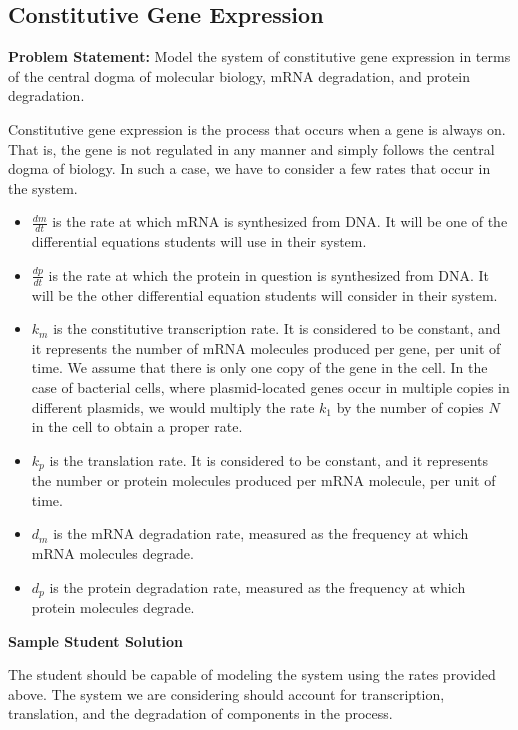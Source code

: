 \subsection{Constitutive Gene Expression}

\textbf{Problem Statement: } Model the system of constitutive gene expression in terms of the central dogma of molecular biology, mRNA degradation, and protein degradation.

Constitutive gene expression is the process that occurs when a gene is always on.
That is, the gene is not regulated in any manner and simply follows the central dogma of biology.
In such a case, we have to consider a few rates that occur in the system. 

\begin{itemize}
    \item $\frac{dm}{dt}$ is the rate at which mRNA is synthesized from DNA.
    It will be one of the differential equations students will use in their system.
    \item $\frac{dp}{dt}$ is the rate at which the protein in question is synthesized from DNA.
    It will be the other differential equation students will consider in their system.
    \item $k_{m}$ is the constitutive transcription rate.
    It is considered to be constant, and it represents the number of mRNA molecules produced per gene, per unit of time.
    We assume that there is only one copy of the gene in the cell.
    In the case of bacterial cells, where plasmid-located genes occur in multiple copies in different plasmids, we would multiply the rate $k_1$ by the number of copies $N$ in the cell to obtain a proper rate.
    \item $k_{p}$ is the translation rate.
    It is considered to be constant, and it represents the number or protein molecules produced per mRNA molecule, per unit of time.
    \item $d_{m}$ is the mRNA degradation rate, measured as the frequency at which mRNA molecules degrade.
    \item $d_{p}$ is the protein degradation rate, measured as the frequency at which protein molecules degrade.
\end{itemize}

\noindent \textbf{Sample Student Solution}

The student should be capable of modeling the system using the rates provided above.
The system we are considering should account for transcription, translation, and the degradation of components in the process.

